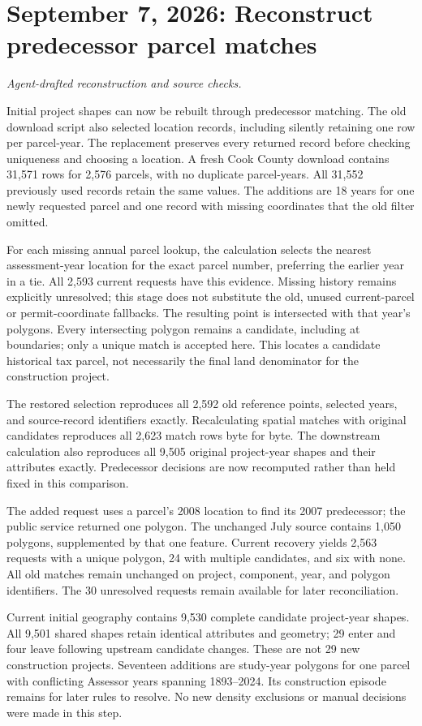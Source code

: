 \section*{September 7, 2026: Reconstruct predecessor parcel matches}
\textit{Agent-drafted reconstruction and source checks.}

Initial project shapes can now be rebuilt through predecessor matching. The old
download script also selected location records, including silently retaining one
row per parcel-year. The replacement preserves every returned record before
checking uniqueness and choosing a location. A fresh Cook County download contains
31,571 rows for 2,576 parcels, with no duplicate parcel-years. All 31,552 previously
used records retain the same values. The additions are 18 years for one newly
requested parcel and one record with missing coordinates that the old filter omitted.

For each missing annual parcel lookup, the calculation selects the nearest
assessment-year location for the exact parcel number, preferring the earlier year
in a tie. All 2,593 current requests have this evidence. Missing history remains
explicitly unresolved; this stage does not substitute the old, unused current-parcel
or permit-coordinate fallbacks. The resulting point is intersected with that year's
polygons. Every intersecting polygon remains a candidate, including at boundaries;
only a unique match is accepted here. This locates a candidate historical tax
parcel, not necessarily the final land denominator for the construction project.

The restored selection reproduces all 2,592 old reference points, selected years,
and source-record identifiers exactly. Recalculating spatial matches with original
candidates reproduces all 2,623 match rows byte for byte. The downstream calculation
also reproduces all 9,505 original project-year shapes and their attributes exactly.
Predecessor decisions are now recomputed rather than held fixed in this comparison.

The added request uses a parcel's 2008 location to find its 2007 predecessor;
the public service returned one polygon. The unchanged July source contains 1,050
polygons, supplemented by that one feature. Current recovery yields 2,563 requests
with a unique polygon, 24 with multiple candidates, and six with none. All old
matches remain unchanged on project, component, year, and polygon identifiers.
The 30 unresolved requests remain available for later reconciliation.

Current initial geography contains 9,530 complete candidate project-year shapes.
All 9,501 shared shapes retain identical attributes and geometry; 29 enter and four
leave following upstream candidate changes. These are not 29 new construction
projects. Seventeen additions are study-year polygons for one parcel with conflicting
Assessor years spanning 1893--2024. Its construction episode remains for later rules
to resolve. No new density exclusions or manual decisions were made in this step.

